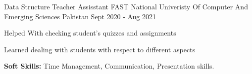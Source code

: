 

\begin{cventries}

  \cventry
    {Data Structure Teacher Assisstant} %
    {FAST National Univeristy Of Computer And Emerging Sciences} %
    {Pakistan} %
    {Sept 2020 - Aug 2021} %
    {
      \begin{cvitems} %
        \item {Helped With checking student's quizzes and assignments}
        \item {Learned dealing with students with respect to different aspects}
        \item {\textbf{Soft Skills:} Time Management, Communication, Presentation skills.}
      \end{cvitems}
    }

\end{cventries}
